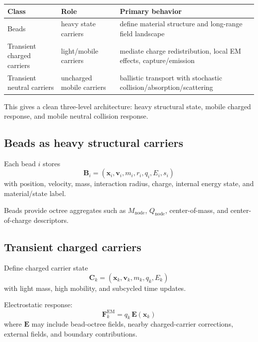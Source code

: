 \documentclass[11pt, a4paper, oneside]{article}
\begin{document}
\begin{center}
\begin{tabularx}{\linewidth}{l l X}
\toprule
Class & Role & Primary behavior \\
\midrule
Beads & heavy state carriers & define material structure and long-range field landscape \\
Transient charged carriers & light/mobile carriers & mediate charge redistribution, local EM effects, capture/emission \\
Transient neutral carriers & uncharged mobile carriers & ballistic transport with stochastic collision/absorption/scattering \\
\bottomrule
\end{tabularx}
\end{center}

This gives a clean three-level architecture: heavy structural state,
mobile charged response, and mobile neutral collision response.

\subsection{Beads as heavy structural carriers}

Each bead $i$ stores
\begin{equation}
\mathbf{B}_i=(\mathbf{x}_i,\mathbf{v}_i,m_i,r_i,q_i,E_i,s_i)
\end{equation}
with position, velocity, mass, interaction radius, charge,
internal energy state, and material/state label.

Beads provide octree aggregates such as
$M_{\mathrm{node}}$, $Q_{\mathrm{node}}$, center-of-mass,
and center-of-charge descriptors.

\subsection{Transient charged carriers}

Define charged carrier state
\begin{equation}
\mathbf{C}_k=(\mathbf{x}_k,\mathbf{v}_k,m_k,q_k,E_k)
\end{equation}
with light mass, high mobility, and subcycled time updates.

Electrostatic response:
\begin{equation}
\mathbf{F}^{\mathrm{EM}}_k=q_k\,\mathbf{E}(\mathbf{x}_k)
\end{equation}
where $\mathbf{E}$ may include bead-octree fields,
nearby charged-carrier corrections, external fields,
and boundary contributions.
\end{document}
